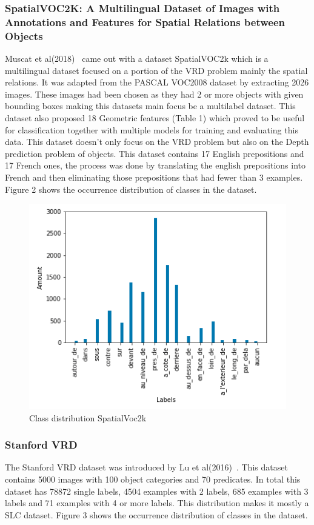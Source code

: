 \documentclass{csfyp}
\begin{document}
\subsubsection{SpatialVOC2K: A Multilingual Dataset of Images with Annotations and Features for Spatial Relations between Objects}
Muscat et al(2018)~\cite{belz-etal-2018-spatialvoc2k} came out with a dataset SpatialVOC2k which is a multilingual dataset focused on a portion of the VRD problem mainly the spatial relations. It was adapted from the PASCAL VOC2008 dataset by extracting 2026 images. These images had been chosen as they had 2 or more objects with given bounding boxes making this datasets main focus be a multilabel dataset. This dataset also proposed 18 Geometric features (Table 1) which proved to be useful for classification together with multiple models for training and evaluating this data. This dataset doesn’t only focus on the VRD problem but also on the Depth prediction problem of objects. This dataset contains 17 English prepositions and 17 French ones, the process was done by translating the english prepositions into French and then eliminating those prepositions that had fewer than 3 examples. Figure 2 shows the occurrence distribution of classes in the dataset.

\begin{figure}[!htbp]
	\includegraphics[scale=0.60,center]{SV2k.pdf}
	\caption{Class distribution SpatialVoc2k}
\end{figure}

\subsubsection{Stanford VRD}
The Stanford VRD dataset was introduced by Lu et al(2016)~\cite{lu2016visual}. This dataset contains 5000 images with 100 object categories and 70 \Gls{predicate}s. In total this dataset has 78872 single labels, 4504 examples with 2 labels, 685 examples with 3 labels and 71 examples with 4 or more labels. This distribution makes it mostly a SLC dataset. Figure 3 shows the occurrence distribution of classes in the dataset.
\end{document}
